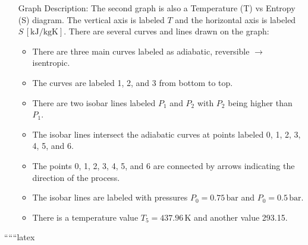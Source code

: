 \begin{itemize}
    \item[Graph Description:] 
    The second graph is also a Temperature (T) vs Entropy (S) diagram. The vertical axis is labeled \( T \) and the horizontal axis is labeled \( S \, [\text{kJ}/\text{kgK}] \). There are several curves and lines drawn on the graph:
    \begin{itemize}
        \item There are three main curves labeled as adiabatic, reversible \(\rightarrow\) isentropic.
        \item The curves are labeled 1, 2, and 3 from bottom to top.
        \item There are two isobar lines labeled \( P_1 \) and \( P_2 \) with \( P_2 \) being higher than \( P_1 \).
        \item The isobar lines intersect the adiabatic curves at points labeled 0, 1, 2, 3, 4, 5, and 6.
        \item The points 0, 1, 2, 3, 4, 5, and 6 are connected by arrows indicating the direction of the process.
        \item The isobar lines are labeled with pressures \( P_0 = 0.75 \, \text{bar} \) and \( P_0 = 0.5 \, \text{bar} \).
        \item There is a temperature value \( T_5 = 437.96 \, \text{K} \) and another value 293.15.
    \end{itemize}
\end{itemize}

``````latex